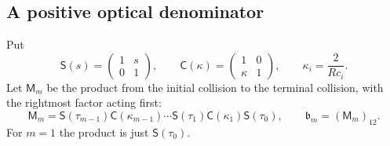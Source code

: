 \subsection{A positive optical denominator}
Put
\begin{equation}\label{eq:v109-optical-matrices}
 \mathsf S(s)=\begin{pmatrix}1&s\\0&1\end{pmatrix},\qquad
 \mathsf C(\kappa)=\begin{pmatrix}1&0\\\kappa&1\end{pmatrix},
 \qquad \kappa_i=\frac{2}{Rc_i}.
\end{equation}
Let $\mathsf M_m$ be the product from the initial collision to the
terminal collision, with the rightmost factor acting first:
\begin{equation}\label{eq:v109-optical-product}
 \mathsf M_m=
 \mathsf S(\tau_{m-1})\mathsf C(\kappa_{m-1})\cdots
 \mathsf S(\tau_1)\mathsf C(\kappa_1)\mathsf S(\tau_0),
 \qquad \mathfrak b_m=(\mathsf M_m)_{12}.
\end{equation}
For $m=1$ the product is just $\mathsf S(\tau_0)$.

